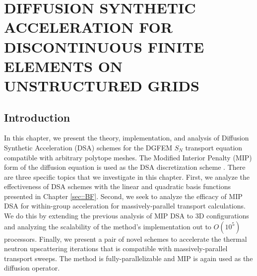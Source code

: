 %
%
%
\chapter{\uppercase {Diffusion Synthetic Acceleration for Discontinuous Finite Elements on Unstructured Grids}}
\label{sec::DSA}

\section{Introduction}
\label{sec::DSA_Introduction}

In this chapter, we present the theory, implementation, and analysis of Diffusion Synthetic Acceleration (DSA) schemes for the DGFEM $S_N$ transport equation compatible with arbitrary polytope meshes. The Modified Interior Penalty (MIP) form of the diffusion equation is used as the DSA discretization scheme \cite{ref::DSA_wang_ragusa,turcksin2014discontinuous}. There are three specific topics that we investigate in this chapter. First, we analyze the effectiveness of DSA schemes with the linear and quadratic basis functions presented in Chapter \ref{sec::BF}. Second, we seek to analyze the efficacy of MIP DSA for within-group acceleration for massively-parallel transport calculations. We do this by extending the previous analysis of MIP DSA to 3D configurations and analyzing the scalability of the method's implementation out to $O(10^5)$ processors. Finally, we present a pair of novel schemes to accelerate the thermal neutron upscattering iterations that is compatible with massively-parallel transport sweeps. The method is fully-parallelizable and MIP is again used as the diffusion operator.

